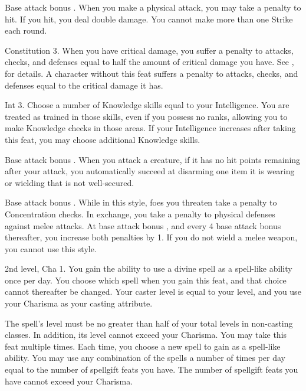 \featpre Base attack bonus .
\featben When you make a physical attack, you may take a  penalty to hit. If you hit, you deal double damage. You cannot make more than one Strike each round.

 Constitution 3.
 When you have critical damage, you suffer a penalty to attacks, checks, and defenses equal to half the amount of critical damage you have. See , for details.
 A character without this feat suffers a penalty to attacks, checks, and defenses equal to the critical damage it has.

 Int 3.
 Choose a number of Knowledge skills equal to your Intelligence. You are treated as trained in those skills, even if you possess no ranks, allowing you to make Knowledge checks in those areas. If your Intelligence increases after taking this feat, you may choose additional Knowledge skills.

\featpre Base attack bonus .
\featben When you attack a creature, if it has no hit points remaining after your attack, you automatically succeed at disarming one item it is wearing or wielding that is not well-secured.

 Base attack bonus .
 While in this style, foes you threaten take a  penalty to Concentration checks. In exchange, you take a  penalty to physical defenses against melee attacks. At base attack bonus , and every 4 base attack bonus thereafter, you increase both penalties by 1. If you do not wield a melee weapon, you cannot use this style.

\featpre 2nd level, Cha 1.
\featben You gain the ability to use a divine spell as a spell-like ability once per day. You choose which spell when you gain this feat, and that choice cannot thereafter be changed. Your caster level is equal to your level, and you use your Charisma as your casting attribute.

The spell's level must be no greater than half of your total levels in non-casting classes. In addition, its level cannot exceed your Charisma.
 You may take this feat multiple times. Each time, you choose a new spell to gain as a spell-like ability. You may use any combination of the spells a number of times per day equal to the number of spellgift feats you have. The number of spellgift feats you have cannot exceed your Charisma.

